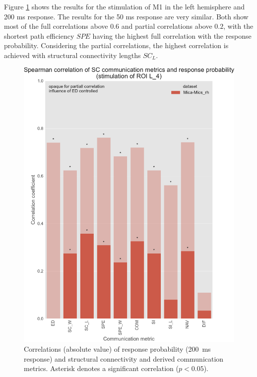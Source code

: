 Figure \ref{fig:ftract_mica_long_probabilities_L4} shows the results for the stimulation of M1 in the left hemisphere and 200 ms response. The results for the 50 ms response are very similar. Both show most of the full correlations above $0.6$ and partial correlations above $0.2$, with the shortest path efficiency $SPE$ having the highest full correlation with the response probability. Considering the partial correlations, the highest correlation is achieved with structural connectivity lengths $SC_L$.

\begin{figure}
    \centering
    \includegraphics[width=\textwidth]{images/nootebook_generated/ftract_results_per_roi/long/MNI-HCP-MMP1/ED0/0.25/Spearman_correlation_of_SC_communication_metrics_and_response_probability_(stimulation_of_ROI_L_4).pdf}
    \caption[F-Tract probability correlations - Mica-Mics\_rh L\_4]{Correlations (absolute value) of response probability (200~ms response) and structural connectivity and derived communication metrics. Asterisk denotes a significant correlation ($p<0.05$).}
    \label{fig:ftract_mica_long_probabilities_L4}
\end{figure}

